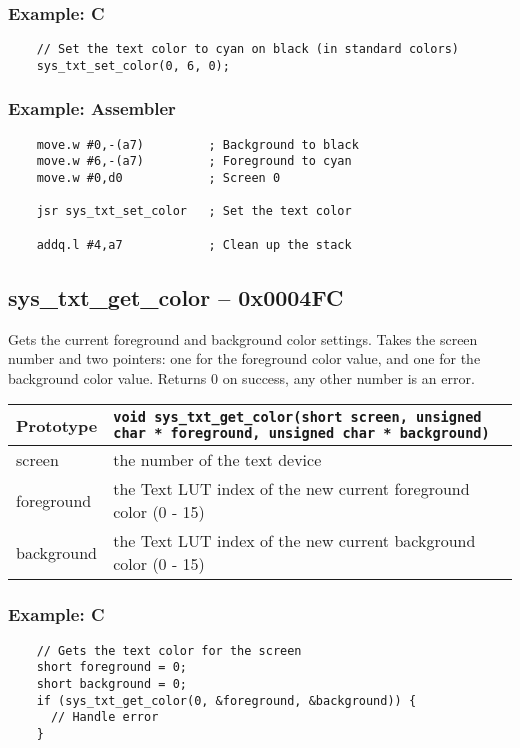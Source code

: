 \subsubsection*{Example: C}
\begin{lstlisting}
    // Set the text color to cyan on black (in standard colors)
    sys_txt_set_color(0, 6, 0);
\end{lstlisting}

\subsubsection*{Example: Assembler}
\begin{verbatim}
    move.w #0,-(a7)         ; Background to black
    move.w #6,-(a7)         ; Foreground to cyan
    move.w #0,d0            ; Screen 0

    jsr sys_txt_set_color   ; Set the text color

    addq.l #4,a7            ; Clean up the stack
\end{verbatim}


\subsection*{sys\_txt\_get\_color -- 0x0004FC}
Gets the current foreground and background color settings.
Takes the screen number and two pointers: one for the foreground color value, and one for the background color value.
Returns 0 on success, any other number is an error.

\bigskip

\begin{tabular}{|l||l|} \hline
Prototype & \lstinline!void sys_txt_get_color(short screen, unsigned char * foreground, unsigned char * background)! \\ \hline
screen & the number of the text device \\ \hline
foreground & the Text LUT index of the new current foreground color (0 - 15) \\ \hline
background & the Text LUT index of the new current background color (0 - 15) \\ \hline
\end{tabular}

\subsubsection*{Example: C}
\begin{lstlisting}
    // Gets the text color for the screen
    short foreground = 0;
    short background = 0;
    if (sys_txt_get_color(0, &foreground, &background)) {
      // Handle error
    }
\end{lstlisting}

